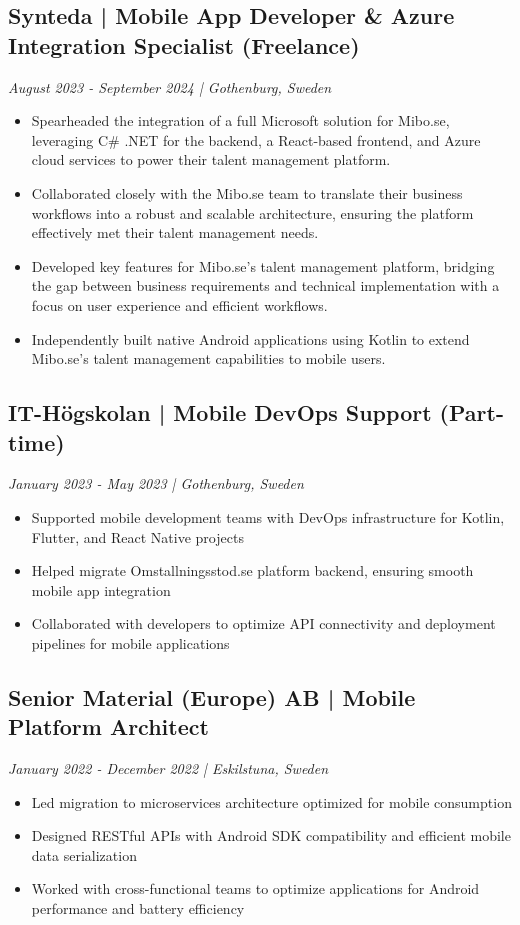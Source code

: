 \documentclass[11pt,a4paper]{article}
\begin{document}
\subsection*{Synteda | Mobile App Developer \& Azure Integration Specialist (Freelance)}
\textit{August 2023 - September 2024 | Gothenburg, Sweden}
\begin{itemize}[noitemsep]
\item Spearheaded the integration of a full Microsoft solution for Mibo.se, leveraging C# .NET for the backend, a React-based frontend, and Azure cloud services to power their talent management platform.
\item Collaborated closely with the Mibo.se team to translate their business workflows into a robust and scalable architecture, ensuring the platform effectively met their talent management needs.
\item Developed key features for Mibo.se's talent management platform, bridging the gap between business requirements and technical implementation with a focus on user experience and efficient workflows.
\item Independently built native Android applications using Kotlin to extend Mibo.se's talent management capabilities to mobile users.
\end{itemize}

\subsection*{IT-Högskolan | Mobile DevOps Support (Part-time)}
\textit{January 2023 - May 2023 | Gothenburg, Sweden}
\begin{itemize}[noitemsep]
\item Supported mobile development teams with DevOps infrastructure for Kotlin, Flutter, and React Native projects
\item Helped migrate Omstallningsstod.se platform backend, ensuring smooth mobile app integration
\item Collaborated with developers to optimize API connectivity and deployment pipelines for mobile applications
\end{itemize}

\subsection*{Senior Material (Europe) AB | Mobile Platform Architect}
\textit{January 2022 - December 2022 | Eskilstuna, Sweden}
\begin{itemize}[noitemsep]
\item Led migration to microservices architecture optimized for mobile consumption
\item Designed RESTful APIs with Android SDK compatibility and efficient mobile data serialization
\item Worked with cross-functional teams to optimize applications for Android performance and battery efficiency
\end{itemize}
\end{document}

